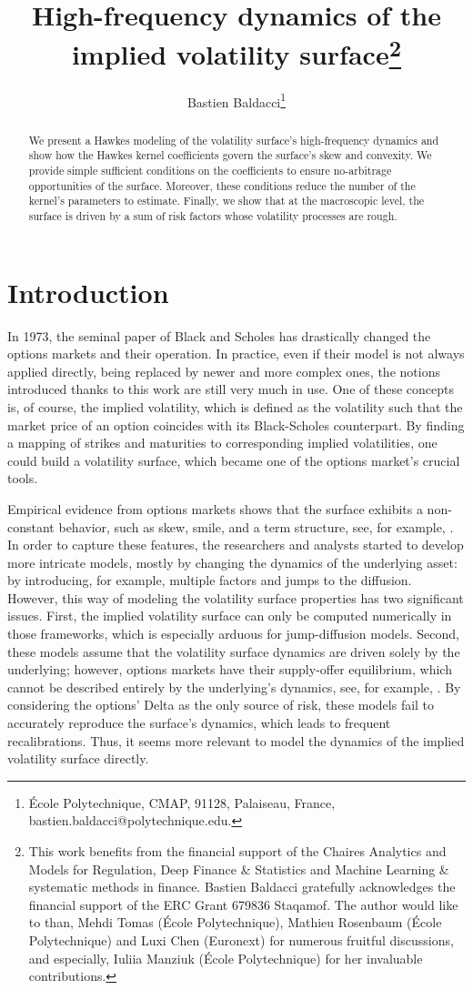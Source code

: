 \documentclass[12pt]{article}
\title{High-frequency dynamics of the implied volatility surface\footnote{This work benefits from the financial support of the Chaires Analytics and Models for Regulation, Deep Finance \& Statistics and Machine Learning \& systematic methods in finance. Bastien Baldacci gratefully acknowledges the financial support of the ERC Grant 679836 Staqamof. The author would like to than, Mehdi Tomas (\'Ecole Polytechnique), Mathieu Rosenbaum (\'Ecole Polytechnique) and Luxi Chen (Euronext) for numerous fruitful discussions, and especially, Iuliia Manziuk (\'Ecole Polytechnique) for her invaluable contributions.}}
\author{Bastien {\sc Baldacci}\footnote{\'Ecole Polytechnique, CMAP, 91128, Palaiseau, France,  bastien.baldacci@polytechnique.edu.} }
\begin{document}
\maketitle
\begin{abstract}
We present a Hawkes modeling of the volatility surface's high-frequency dynamics and show how the Hawkes kernel coefficients govern the surface's skew and convexity. We provide simple sufficient conditions on the coefficients to ensure no-arbitrage opportunities of the surface. Moreover, these conditions reduce the number of the kernel's parameters to estimate. Finally, we show that at the macroscopic level, the surface is driven by a sum of risk factors whose volatility processes are rough. 
\end{abstract}

\section{Introduction}

In 1973, the seminal paper of Black and Scholes \cite{black1973pricing} has drastically changed the options markets and their operation. In practice, even if their model is not always applied directly, being replaced by newer and more complex ones, the notions introduced thanks to this work are still very much in use. One of these concepts is, of course, the implied volatility, which is defined as the volatility such that the market price of an option coincides with its Black-Scholes counterpart. By finding a mapping of strikes and maturities to corresponding implied volatilities, one could build a volatility surface, which became one of the options market's crucial tools. \medskip

Empirical evidence from options markets shows that the surface exhibits a non-constant behavior, such as skew, smile, and a term structure, see, for example, \cite{derman1999regimes, derman1996local, engle2000testing}. In order to capture these features, the researchers and analysts started to develop more intricate models, mostly by changing the dynamics of the underlying asset: by introducing, for example, multiple factors and jumps to the diffusion. However, this way of modeling the volatility surface properties has two significant issues. First, the implied volatility surface can only be computed numerically in those frameworks, which is especially arduous for jump-diffusion models. Second, these models assume that the volatility surface dynamics are driven solely by the underlying; however, options markets have their supply-offer equilibrium, which cannot be described entirely by the underlying's dynamics, see, for example, \cite{bakshi2000call}. By considering the options' Delta as the only source of risk, these models fail to accurately reproduce the surface's dynamics, which leads to frequent recalibrations. Thus, it seems more relevant to model the dynamics of the implied volatility surface directly. 
\end{document}
